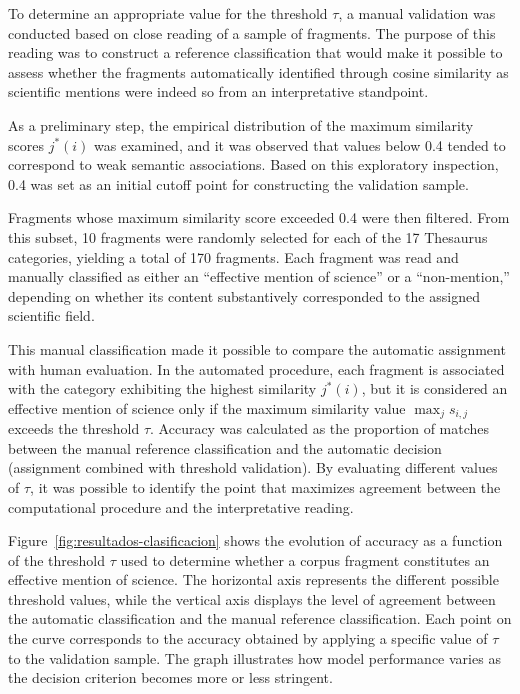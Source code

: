 \documentclass[11pt,a4paper]{article}
\begin{document}
To determine an appropriate value for the threshold $\tau$, a manual validation was conducted based on close reading of a sample of fragments. The purpose of this reading was to construct a reference classification that would make it possible to assess whether the fragments automatically identified through cosine similarity as scientific mentions were indeed so from an interpretative standpoint.

As a preliminary step, the empirical distribution of the maximum similarity scores $j^*(i)$ was examined, and it was observed that values below 0.4 tended to correspond to weak semantic associations. Based on this exploratory inspection, 0.4 was set as an initial cutoff point for constructing the validation sample.

Fragments whose maximum similarity score exceeded 0.4 were then filtered. From this subset, 10 fragments were randomly selected for each of the 17 Thesaurus categories, yielding a total of 170 fragments. Each fragment was read and manually classified as either an “effective mention of science” or a “non-mention,” depending on whether its content substantively corresponded to the assigned scientific field.

This manual classification made it possible to compare the automatic assignment with human evaluation. In the automated procedure, each fragment is associated with the category exhibiting the highest similarity $j^*(i)$, but it is considered an effective mention of science only if the maximum similarity value $\max_j s_{i,j}$ exceeds the threshold $\tau$. Accuracy was calculated as the proportion of matches between the manual reference classification and the automatic decision (assignment combined with threshold validation). By evaluating different values of $\tau$, it was possible to identify the point that maximizes agreement between the computational procedure and the interpretative reading.

Figure~\ref{fig:resultados-clasificacion} shows the evolution of accuracy as a function of the threshold $\tau$ used to determine whether a corpus fragment constitutes an effective mention of science. The horizontal axis represents the different possible threshold values, while the vertical axis displays the level of agreement between the automatic classification and the manual reference classification. Each point on the curve corresponds to the accuracy obtained by applying a specific value of $\tau$ to the validation sample. The graph illustrates how model performance varies as the decision criterion becomes more or less stringent.
\end{document}
